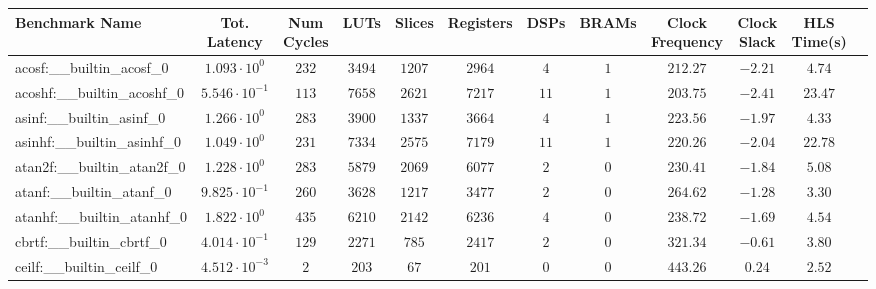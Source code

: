 \begin{tabular}{|l|c|c|c|c|c|c|c|c|c|c|c|}
\hline
Benchmark Name                            & Tot. Latency            & Num Cycles & LUTs       & Slices    & Registers  & DSPs    & BRAMs & Clock Frequency & Clock Slack & HLS Time(s) \\
\hline
acosf:\_\_builtin\_acosf\_0               & $ 1.093 \cdot 10^{0}  $ & $ 232    $ & $ 3494   $ & $ 1207  $ & $ 2964   $ & $ 4   $ & $ 1 $ & $ 212.27      $ & $ -2.21   $ & $ 4.74    $ \\
acoshf:\_\_builtin\_acoshf\_0             & $ 5.546 \cdot 10^{-1} $ & $ 113    $ & $ 7658   $ & $ 2621  $ & $ 7217   $ & $ 11  $ & $ 1 $ & $ 203.75      $ & $ -2.41   $ & $ 23.47   $ \\
asinf:\_\_builtin\_asinf\_0               & $ 1.266 \cdot 10^{0}  $ & $ 283    $ & $ 3900   $ & $ 1337  $ & $ 3664   $ & $ 4   $ & $ 1 $ & $ 223.56      $ & $ -1.97   $ & $ 4.33    $ \\
asinhf:\_\_builtin\_asinhf\_0             & $ 1.049 \cdot 10^{0}  $ & $ 231    $ & $ 7334   $ & $ 2575  $ & $ 7179   $ & $ 11  $ & $ 1 $ & $ 220.26      $ & $ -2.04   $ & $ 22.78   $ \\
atan2f:\_\_builtin\_atan2f\_0             & $ 1.228 \cdot 10^{0}  $ & $ 283    $ & $ 5879   $ & $ 2069  $ & $ 6077   $ & $ 2   $ & $ 0 $ & $ 230.41      $ & $ -1.84   $ & $ 5.08    $ \\
atanf:\_\_builtin\_atanf\_0               & $ 9.825 \cdot 10^{-1} $ & $ 260    $ & $ 3628   $ & $ 1217  $ & $ 3477   $ & $ 2   $ & $ 0 $ & $ 264.62      $ & $ -1.28   $ & $ 3.30    $ \\
atanhf:\_\_builtin\_atanhf\_0             & $ 1.822 \cdot 10^{0}  $ & $ 435    $ & $ 6210   $ & $ 2142  $ & $ 6236   $ & $ 4   $ & $ 0 $ & $ 238.72      $ & $ -1.69   $ & $ 4.54    $ \\
cbrtf:\_\_builtin\_cbrtf\_0               & $ 4.014 \cdot 10^{-1} $ & $ 129    $ & $ 2271   $ & $ 785   $ & $ 2417   $ & $ 2   $ & $ 0 $ & $ 321.34      $ & $ -0.61   $ & $ 3.80    $ \\
ceilf:\_\_builtin\_ceilf\_0               & $ 4.512 \cdot 10^{-3} $ & $ 2      $ & $ 203    $ & $ 67    $ & $ 201    $ & $ 0   $ & $ 0 $ & $ 443.26      $ & $ 0.24    $ & $ 2.52    $ \\

\end{tabular}
